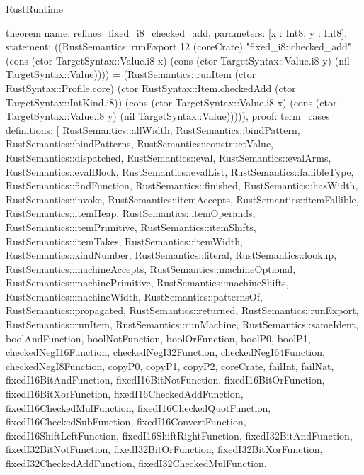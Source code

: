 \begin{lexlean}{RustRuntime}
\begin{semanticmodule}
theorem{
  name: refines_fixed_i8_checked_add,
  parameters: [x : Int8, y : Int8],
  statement: ((RustSemantics::runExport 12 (coreCrate) "fixed_i8::checked_add" (cons (ctor TargetSyntax::Value.i8 x) (cons (ctor TargetSyntax::Value.i8 y) (nil TargetSyntax::Value)))) = (RustSemantics::runItem (ctor RustSyntax::Profile.core) (ctor RustSyntax::Item.checkedAdd (ctor TargetSyntax::IntKind.i8)) (cons (ctor TargetSyntax::Value.i8 x) (cons (ctor TargetSyntax::Value.i8 y) (nil TargetSyntax::Value))))),
  proof: term_cases{
    definitions: [
      RustSemantics::allWidth,
      RustSemantics::bindPattern,
      RustSemantics::bindPatterns,
      RustSemantics::constructValue,
      RustSemantics::dispatched,
      RustSemantics::eval,
      RustSemantics::evalArms,
      RustSemantics::evalBlock,
      RustSemantics::evalList,
      RustSemantics::fallibleType,
      RustSemantics::findFunction,
      RustSemantics::finished,
      RustSemantics::hasWidth,
      RustSemantics::invoke,
      RustSemantics::itemAccepts,
      RustSemantics::itemFallible,
      RustSemantics::itemHeap,
      RustSemantics::itemOperands,
      RustSemantics::itemPrimitive,
      RustSemantics::itemShifts,
      RustSemantics::itemTakes,
      RustSemantics::itemWidth,
      RustSemantics::kindNumber,
      RustSemantics::literal,
      RustSemantics::lookup,
      RustSemantics::machineAccepts,
      RustSemantics::machineOptional,
      RustSemantics::machinePrimitive,
      RustSemantics::machineShifts,
      RustSemantics::machineWidth,
      RustSemantics::patternsOf,
      RustSemantics::propagated,
      RustSemantics::returned,
      RustSemantics::runExport,
      RustSemantics::runItem,
      RustSemantics::runMachine,
      RustSemantics::sameIdent,
      boolAndFunction,
      boolNotFunction,
      boolOrFunction,
      boolP0,
      boolP1,
      checkedNegI16Function,
      checkedNegI32Function,
      checkedNegI64Function,
      checkedNegI8Function,
      copyP0,
      copyP1,
      copyP2,
      coreCrate,
      failInt,
      failNat,
      fixedI16BitAndFunction,
      fixedI16BitNotFunction,
      fixedI16BitOrFunction,
      fixedI16BitXorFunction,
      fixedI16CheckedAddFunction,
      fixedI16CheckedMulFunction,
      fixedI16CheckedQuotFunction,
      fixedI16CheckedSubFunction,
      fixedI16ConvertFunction,
      fixedI16ShiftLeftFunction,
      fixedI16ShiftRightFunction,
      fixedI32BitAndFunction,
      fixedI32BitNotFunction,
      fixedI32BitOrFunction,
      fixedI32BitXorFunction,
      fixedI32CheckedAddFunction,
      fixedI32CheckedMulFunction,
}}
\end{semanticmodule}
\end{lexlean}
